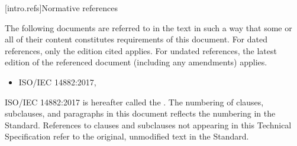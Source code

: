 
[intro.refs]{Normative references}

\pnum

The following documents are referred to in the text in such a way
that some or all of their content constitutes requirements of this 
document. For dated references, only the edition cited applies.
 For undated references, the latest edition
 of the referenced document (including any amendments) applies.

 \begin{itemize}
 \item ISO/IEC 14882:2017, 
 \end{itemize}

ISO/IEC 14882:2017 is hereafter called the .
 The numbering of clauses, subclauses, and paragraphs in this document
 reflects the numbering in the \Cpp Standard. References to clauses
 and subclauses not appearing in this Technical Specification refer to
 the original, unmodified text in the \Cpp Standard.

